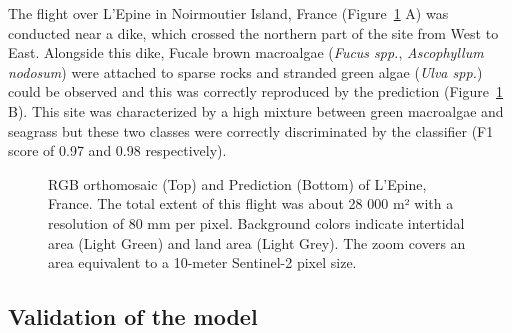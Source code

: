 \documentclass[
  number]{elsarticle}
\begin{document}
The flight over L'Epine in Noirmoutier Island, France
(Figure~\ref{fig-Dike} A) was conducted near a dike, which crossed the
northern part of the site from West to East. Alongside this dike, Fucale
brown macroalgae (\emph{Fucus spp.}, \emph{Ascophyllum nodosum}) were
attached to sparse rocks and stranded green algae (\emph{Ulva spp.})
could be observed and this was correctly reproduced by the prediction
(Figure~\ref{fig-Dike} B). This site was characterized by a high mixture
between green macroalgae and seagrass but these two classes were
correctly discriminated by the classifier (F1 score of 0.97 and 0.98
respectively).

\label{cell-fig-Dike}
\begin{figure}[H]


\caption{\label{fig-Dike}RGB orthomosaic (Top) and Prediction (Bottom)
of L'Epine, France. The total extent of this flight was about 28 000 m²
with a resolution of 80 mm per pixel. Background colors indicate
intertidal area (Light Green) and land area (Light Grey). The zoom
covers an area equivalent to a 10-meter Sentinel-2 pixel size.}

\end{figure}%

\subsection{Validation of the model}\label{validation-of-the-model}
\end{document}
